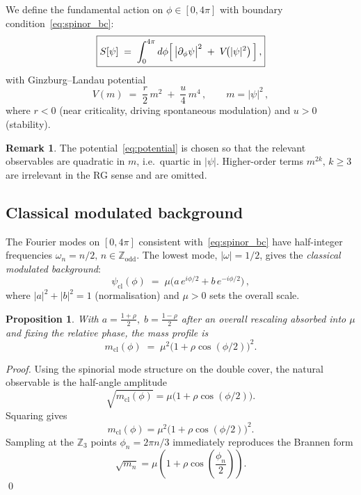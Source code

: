 \documentclass[12pt,a4paper]{article}
\newtheorem{proposition}[theorem]{Proposition}
\theoremstyle{definition}
\newtheorem{remark}[theorem]{Remark}
\newcommand{\mcl}{m_{\mathrm{cl}}}
\newcommand{\psicl}{\psi_{\mathrm{cl}}}
\begin{document}
We define the fundamental action on $\phi \in [0,4\pi]$ with boundary
condition~\eqref{eq:spinor_bc}:
\begin{equation}
  \label{eq:action}
  \boxed{
  S[\psi] \;=\; \int_0^{4\pi} d\phi
  \Bigl[\,\bigl|\partial_\phi\psi\bigr|^2 \;+\; V\!\bigl(|\psi|^2\bigr)\,\Bigr]\,,}
\end{equation}
with Ginzburg--Landau potential
\begin{equation}
  \label{eq:potential}
  V(m) \;=\; \frac{r}{2}\,m^2 \;+\; \frac{u}{4}\,m^4\,,
  \qquad m = |\psi|^2\,,
\end{equation}
where $r < 0$ (near criticality, driving spontaneous modulation) and $u > 0$
(stability).

\begin{remark}
The potential~\eqref{eq:potential} is chosen so that the relevant observables are
quadratic in $m$, i.e.\ quartic in $|\psi|$.
Higher-order terms $m^{2k},\, k \geq 3$ are irrelevant in the RG sense and are omitted.
\end{remark}

\subsection{Classical modulated background}

The Fourier modes on $[0,4\pi]$ consistent with~\eqref{eq:spinor_bc} have
half-integer frequencies $\omega_n = n/2,\, n \in \mathbb{Z}_{\mathrm{odd}}$.
The lowest mode, $|\omega| = 1/2$, gives the \emph{classical modulated background}:
\begin{equation}
  \label{eq:psi_cl}
  \psicl(\phi) \;=\; \mu\bigl(a\,e^{i\phi/2} + b\,e^{-i\phi/2}\bigr)\,,
\end{equation}
where $|a|^2 + |b|^2 = 1$ (normalisation) and $\mu > 0$ sets the overall scale.

\begin{proposition}
\label{prop:mass_profile}
With $a = \tfrac{1+\rho}{2},\; b = \tfrac{1-\rho}{2}$ after an overall rescaling absorbed into $\mu$
and fixing the relative phase, the mass profile is
\begin{equation}
  \label{eq:mass_profile}
  \mcl(\phi)
  \;=\;
  \mu^2\bigl(1+\rho\cos(\phi/2)\bigr)^2 .
\end{equation}
\end{proposition}

\begin{proof}
Using the spinorial mode structure on the double cover,
the natural observable is the half-angle amplitude
\[
\sqrt{\mcl(\phi)}
=
\mu\bigl(1+\rho\cos(\phi/2)\bigr).
\]
Squaring gives
\[
\mcl(\phi)
=
\mu^2\bigl(1+\rho\cos(\phi/2)\bigr)^2 .
\]
Sampling at the $\mathbb{Z}_3$ points
$\phi_n = 2\pi n/3$
immediately reproduces the Brannen form
\[
\sqrt{m_n}
=
\mu\left(
1+\rho\cos\left(\frac{\phi_n}{2}\right)
\right).
\]
\qed
\end{proof}
\end{document}
